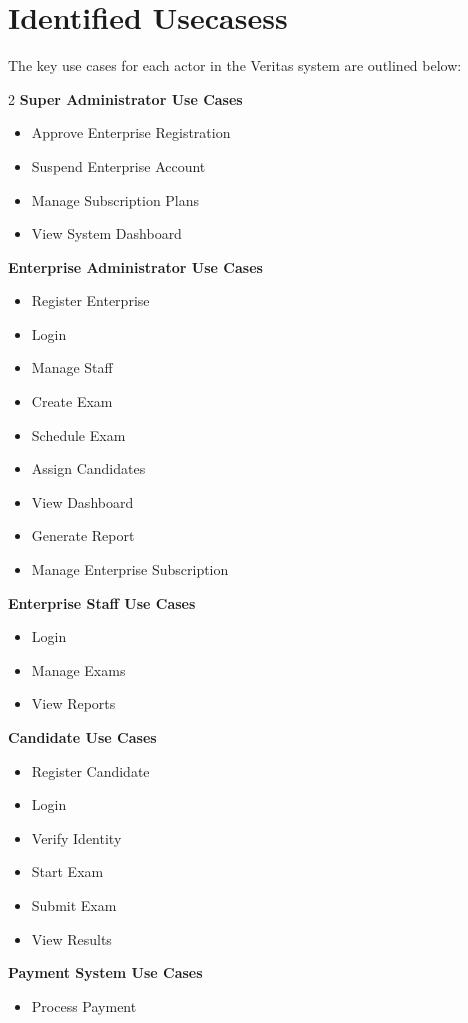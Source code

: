 \section*{Identified Usecasess}
The key use cases for each actor in the Veritas system are outlined below:
\begin{multicols}{2}\raggedcolumns
\textbf{Super Administrator Use Cases}
\begin{itemize}
    \item Approve Enterprise Registration
    \item Suspend Enterprise Account
    \item Manage Subscription Plans
    \item View System Dashboard
\end{itemize}

\textbf{Enterprise Administrator Use Cases}
\begin{itemize}
    \item Register Enterprise
    \item Login
    \item Manage Staff
    \item Create Exam
    \item Schedule Exam
    \item Assign Candidates
    \item View Dashboard
    \item Generate Report
    \item Manage Enterprise Subscription
\end{itemize}

\textbf{Enterprise Staff Use Cases}
\begin{itemize}
    \item Login
    \item Manage Exams
    \item View Reports
\end{itemize}

\textbf{Candidate Use Cases}
\begin{itemize}
    \item Register Candidate
    \item Login
    \item Verify Identity
    \item Start Exam
    \item Submit Exam
    \item View Results
\end{itemize}

\textbf{Payment System Use Cases}
\begin{itemize}
    \item Process Payment
\end{itemize}
\end{multicols}


